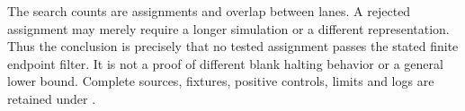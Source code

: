 The search counts are assignments and overlap between lanes. A rejected
assignment may merely require a longer simulation or a different
representation. Thus the conclusion is precisely that no tested
assignment passes the stated finite endpoint filter. It is not a proof
of different blank halting behavior or a general lower bound. Complete
sources, fixtures, positive controls, limits and logs are retained under
.
